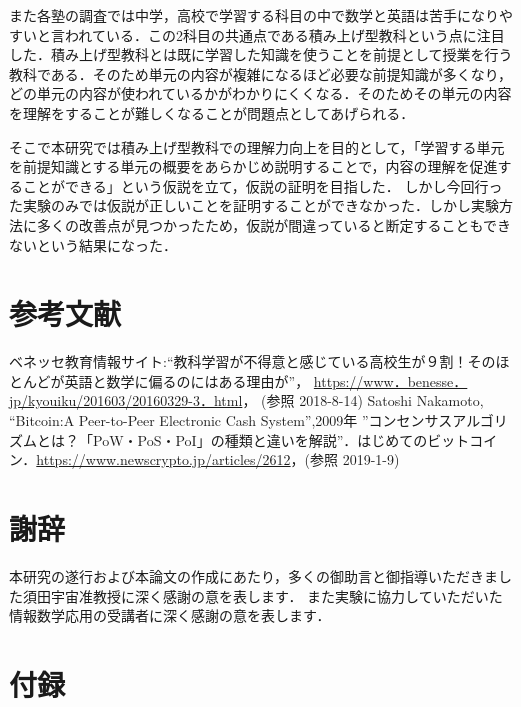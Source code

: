 \documentclass[a4j,12pt]{jsarticle}
\begin{document}
また各塾の調査では中学，高校で学習する科目の中で数学と英語は苦手になりやすいと言われている．この2科目の共通点である積み上げ型教科という点に注目した．積み上げ型教科とは既に学習した知識を使うことを前提として授業を行う教科である．そのため単元の内容が複雑になるほど必要な前提知識が多くなり，どの単元の内容が使われているかがわかりにくくなる．そのためその単元の内容を理解をすることが難しくなることが問題点としてあげられる．

そこで本研究では積み上げ型教科での理解力向上を目的として，「学習する単元を前提知識とする単元の概要をあらかじめ説明することで，内容の理解を促進することができる」という仮説を立て，仮説の証明を目指した．
しかし今回行った実験のみでは仮説が正しいことを証明することができなかった．しかし実験方法に多くの改善点が見つかったため，仮説が間違っていると断定することもできないという結果になった．



\newpage
\section{参考文献}
\begin{thebibliography}{9}
ベネッセ教育情報サイト:“教科学習が不得意と感じている高校生が９割！そのほとんどが英語と数学に偏るのにはある理由が”， \url{https://www．benesse．jp/kyouiku/201603/20160329-3．html}， (参照 2018-8-14)
Satoshi Nakamoto, “Bitcoin:A Peer-to-Peer Electronic Cash System”,2009年
 ”コンセンサスアルゴリズムとは？「PoW・PoS・PoI」の種類と違いを解説”．はじめてのビットコイン．\url{https://www.newscrypto.jp/articles/2612}，(参照 2019-1-9)
\end{thebibliography}

\section{謝辞}
本研究の遂行および本論文の作成にあたり，多くの御助言と御指導いただきました須田宇宙准教授に深く感謝の意を表します．
また実験に協力していただいた情報数学応用の受講者に深く感謝の意を表します．

\section{付録}
\end{document}
